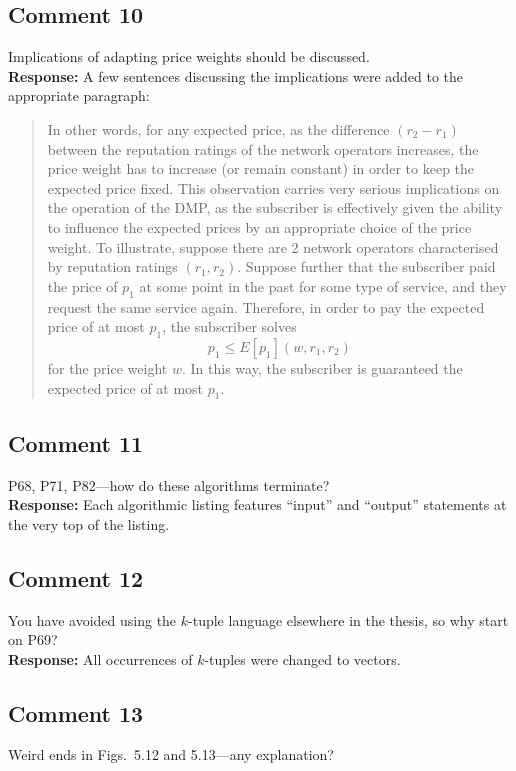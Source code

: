 \documentclass[10pt,a4paper,notitlepage]{article}
\numberwithin{equation}{section}
\begin{document}
\subsection{Comment 10}
Implications of adapting price weights should be discussed.\\[-2ex]

\textbf{Response:}
A few sentences discussing the implications were added to the appropriate paragraph:
\begin{quote}
In other words, for any expected price, as the difference $(r_2-r_1)$ between the reputation ratings of the network operators increases, the price weight has to increase (or remain constant) in order to keep the expected price fixed. This observation carries very serious implications on the operation of the DMP, as the subscriber is effectively given the ability to influence the expected prices by an appropriate choice of the price weight. To illustrate, suppose there are 2 network operators characterised by reputation ratings $(r_1, r_2)$. Suppose further that the subscriber paid the price of $p_1$ at some point in the past for some type of service, and they request the same service again. Therefore, in order to pay the expected price of at most $p_1$, the subscriber solves
\begin{equation}
p_1 \le E[p_1](w, r_1, r_2)
\end{equation}
for the price weight $w$. In this way, the subscriber is guaranteed the expected price of at most $p_1$.
\end{quote}

\subsection{Comment 11}
P68, P71, P82---how do these algorithms terminate?\\[-2ex]

\textbf{Response:}
Each algorithmic listing features ``input'' and ``output'' statements at the very top of the listing.

\subsection{Comment 12}
You have avoided using the $k$-tuple language elsewhere in the thesis, so why start on P69?\\[-2ex]

\textbf{Response:}
All occurrences of $k$-tuples were changed to vectors.

\subsection{Comment 13}
Weird ends in Figs.~5.12 and 5.13---any explanation?\\[-2ex]
\end{document}
